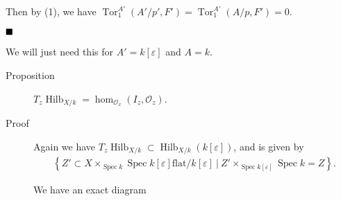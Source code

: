 Then by (1), we have
\(\operatorname{Tor}_1^{A'}(A'/p', F') = \operatorname{Tor}_1^{A'}(A/p, F') = 0\).

\(\hfill\blacksquare\)

We will just need this for \(A' = k[\varepsilon]\) and \(A=k\).

\begin{description}
\item[Proposition]
\(T_z \operatorname{Hilb}_{X/k} = \hom_{{\mathcal{O}}_x}(I_z, {\mathcal{O}}_z)\).
\item[Proof]
Again we have
\(T_z \operatorname{Hilb}_{X/k} \subset \operatorname{Hilb}_{X/k}(k[\varepsilon])\),
and is given by
\begin{align*}
\left\{{Z' \subset X \times_{\operatorname{Spec}k} \operatorname{Spec}k[\varepsilon] \text{flat}/k[\varepsilon] {~\mathrel{\Big|}~}Z' \times_{\operatorname{Spec}k[\varepsilon]}\operatorname{Spec}k = Z}\right\}
.\end{align*}

We have an exact diagram

\begin{center}
\end{center}


\end{description}
